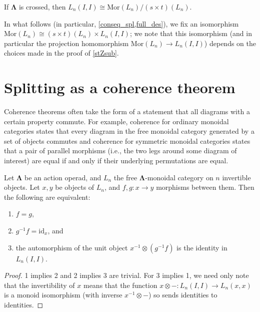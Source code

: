 \documentclass{amsbook} %
\newcommand{\id}{\textrm{id}}
\newcommand{\ML}{\mathbf{\Lambda}}
\newcommand{\MorLn}{\mathrm{Mor}(L_n)}
\numberwithin{section}{chapter}
\begin{document}
\begin{cor}\label{lnII_mormodst}
If $\ML$ is crossed, then $L_n(I,I) \cong \MorLn / (s \times t)(L_n)$.
\end{cor}

\begin{conv}
In what follows (in particular, \cref{conseq_spl,full_des}), we fix an isomorphism $\MorLn \cong (s \times t)(L_n) \times L_n(I,I)$; we note that this isomorphism (and in particular the projection homomorphism $\MorLn \to L_n(I,I)$) depends on the choices made in the proof of \cref{stZsub}.

\end{conv}

\section{Splitting as a coherence theorem}\label{splitting_as_coh}

Coherence theorems often take the form of a statement that all diagrams with a certain property commute. For example, coherence for ordinary monoidal categories states that every diagram in the free monoidal category generated by a set of objects commutes and coherence for symmetric monoidal categories states that a pair of parallel morphisms (i.e., the two legs around some diagram of interest) are equal if and only if their underlying permutations are equal.

\begin{thm}\label{split_coh}
Let $\ML$ be an action operad, and $L_n$ the free $\ML$-monoidal category on $n$ invertible objects. Let $x, y$ be objects of $L_n$, and $f, g: x \to y$ morphisms between them. Then the following are equivalent:
\begin{enumerate}
\item $f = g$,
\item $g^{-1} f = \id_x$, and
\item the automorphism of the unit object $x^{-1} \otimes (g^{-1} f)$ is the identity in $L_n(I,I)$.
\end{enumerate}
\end{thm}
\begin{proof}
1 implies 2 and 2 implies 3 are trivial. For 3 implies 1, we need only note that the invertibility of $x$ means that the function $x \otimes -:L_n(I,I) \to L_n(x,x)$ is a monoid isomorphism (with inverse $x^{-1} \otimes -$) so sends identities to identities.
\end{proof}
\end{document}
